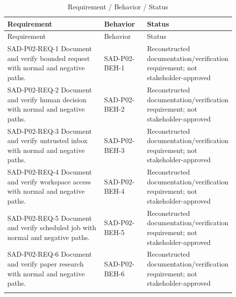 \documentclass[10pt,letterpaper]{article}
\begin{document}
\begin{longtable}{@{}>{\raggedright\arraybackslash}p{0.44\linewidth}>{\raggedright\arraybackslash}p{0.19\linewidth}>{\raggedright\arraybackslash}p{0.29\linewidth}@{}}
\caption{Requirement / Behavior / Status}\\
\toprule Requirement & Behavior & Status\\\midrule\endfirsthead
\toprule Requirement & Behavior & Status\\\midrule\endhead
SAD-P02-REQ-1 Document and verify bounded request with normal and negative paths. & SAD-P02-BEH-1 & Reconstructed documentation/verification requirement; not stakeholder-approved\\\addlinespace
SAD-P02-REQ-2 Document and verify human decision with normal and negative paths. & SAD-P02-BEH-2 & Reconstructed documentation/verification requirement; not stakeholder-approved\\\addlinespace
SAD-P02-REQ-3 Document and verify untrusted inbox with normal and negative paths. & SAD-P02-BEH-3 & Reconstructed documentation/verification requirement; not stakeholder-approved\\\addlinespace
SAD-P02-REQ-4 Document and verify workspace access with normal and negative paths. & SAD-P02-BEH-4 & Reconstructed documentation/verification requirement; not stakeholder-approved\\\addlinespace
SAD-P02-REQ-5 Document and verify scheduled job with normal and negative paths. & SAD-P02-BEH-5 & Reconstructed documentation/verification requirement; not stakeholder-approved\\\addlinespace
SAD-P02-REQ-6 Document and verify paper research with normal and negative paths. & SAD-P02-BEH-6 & Reconstructed documentation/verification requirement; not stakeholder-approved\\\addlinespace
\bottomrule\end{longtable}
\end{document}
